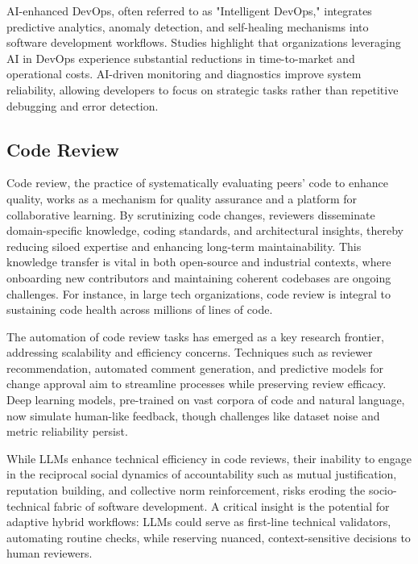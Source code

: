 \documentclass[12pt]{article}
\begin{document}
AI-enhanced DevOps, often referred to as "Intelligent DevOps," integrates predictive analytics, anomaly detection, and self-healing mechanisms into software development workflows. Studies highlight that organizations leveraging AI in DevOps experience substantial reductions in time-to-market and operational costs. AI-driven monitoring and diagnostics improve system reliability, allowing developers to focus on strategic tasks rather than repetitive debugging and error detection. \cite{interdisciplinaryAIMLDevopsAutomation}
    
\subsection{Code Review}
Code review, the practice of systematically evaluating peers' code to enhance quality, works as a mechanism for quality assurance and a platform for collaborative learning. By scrutinizing code changes, reviewers disseminate domain-specific knowledge, coding standards, and architectural insights, thereby reducing siloed expertise and enhancing long-term maintainability. This knowledge transfer is vital in both open-source and industrial contexts, where onboarding new contributors and maintaining coherent codebases are ongoing challenges. For instance, in large tech organizations, code review is integral to sustaining code health across millions of lines of code. \cite{codereviewStudy}

The automation of code review tasks has emerged as a key research frontier, addressing scalability and efficiency concerns. Techniques such as reviewer recommendation, automated comment generation, and predictive models for change approval aim to streamline processes while preserving review efficacy. Deep learning models, pre-trained on vast corpora of code and natural language, now simulate human-like feedback, though challenges like dataset noise and metric reliability persist. \cite{codereviewStudy}

While LLMs enhance technical efficiency in code reviews, their inability to engage in the reciprocal social dynamics of accountability such as mutual justification, reputation building, and collective norm reinforcement, risks eroding the socio-technical fabric of software development. A critical insight is the potential for adaptive hybrid workflows: LLMs could serve as first-line technical validators, automating routine checks, while reserving nuanced, context-sensitive decisions  to human reviewers. \cite{accountability}
\end{document}
